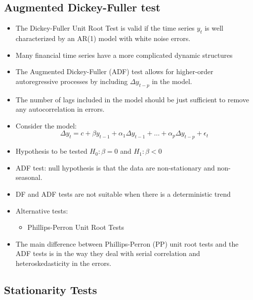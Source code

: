 \documentclass[]{book}
\providecommand{\tightlist}{%
  \setlength{\itemsep}{0pt}\setlength{\parskip}{0pt}}
\begin{document}
\hypertarget{augmented-dickey-fuller-test}{%
\subsection{Augmented Dickey-Fuller test}\label{augmented-dickey-fuller-test}}

\begin{itemize}
\item
  The Dickey-Fuller Unit Root Test is valid if the time series \(y_t\) is well characterized by an AR(1) model with white noise errors.
\item
  Many financial time series have a more complicated dynamic structures
\item
  The Augmented Dickey-Fuller (ADF) test allows for higher-order autoregressive processes by including \(\Delta y_{t−p}\) in the model.
\item
  The number of lags included in the model should be just sufficient to remove any autocorrelation in errors.
\item
  Consider the model:
  \[\Delta y_t = c+ \beta y_{t-1}+ \alpha_1 \Delta y_{t-1}+\dots + \alpha_p \Delta y_{t-p} +\epsilon_{t}\]
\end{itemize}

\begin{itemize}
\item
  Hypothesis to be tested
  \(H_0: \beta = 0\) and \(H_1: \beta<0\)
\item
  ADF test: null hypothesis is that the data are non-stationary and non-seasonal.
\item
  DF and ADF tests are not suitable when there is a deterministic trend
\item
  Alternative tests:

  \begin{itemize}
  \tightlist
  \item
    Phillips-Perron Unit Root Tests
  \end{itemize}
\item
  The main difference between Phillips-Perron (PP) unit root tests and the ADF tests is in the way they deal with serial correlation and heteroskedasticity in the errors.
\end{itemize}

\hypertarget{stationarity-tests}{%
\subsection{Stationarity Tests}\label{stationarity-tests}}
\end{document}

